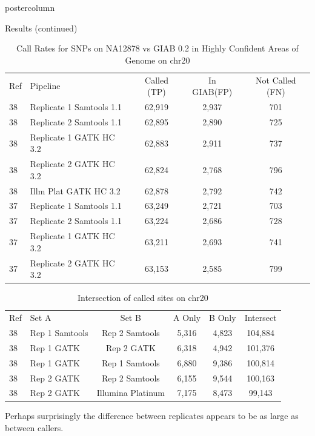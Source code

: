 \documentclass[final]{beamer}
\begin{document}
\begin{frame}{}
\begin{columns}
\begin{column}{.49\textwidth}
\begin{beamercolorbox}[center,wd=\textwidth]{postercolumn}
\begin{minipage}[T]{.95\textwidth}
            \begin{block}{Results (continued)}
            \begin{table}[h]
\begin{tabular}{|l|l|c|c|c|}
\hline
Ref & Pipeline & Called (TP) & In GIAB(FP) & Not Called (FN) \\ \cline{1-5}
38 & Replicate 1 Samtools 1.1 & 62,919 & 2,937 & 701 \\
38 & Replicate 2 Samtools 1.1 & 62,895 & 2,890 & 725 \\
38 & Replicate 1 GATK HC 3.2 & 62,883 & 2,911 & 737 \\
38 & Replicate 2 GATK HC 3.2 & 62,824 & 2,768 & 796 \\
38 & Illm Plat GATK HC 3.2 & 62,878 & 2,792 & 742 \\
37 & Replicate 1 Samtools 1.1 & 63,249 & 2,721 & 703 \\
37 & Replicate 2 Samtools 1.1 & 63,224 & 2,686 & 728 \\
37 & Replicate 1 GATK HC 3.2 & 63,211 & 2,693 & 741 \\
37 & Replicate 2 GATK HC 3.2 & 63,153 & 2,585 & 799 \\ \cline{1-5}
\hline
\end{tabular}
\caption{Call Rates for SNPs on NA12878 vs GIAB 0.2 in Highly Confident Areas of Genome on chr20}
\label{table:2}
\end{table}

            \begin{table}[h]
\begin{tabular}{|l|l|c|c|c|c|}
\hline
Ref & Set A & Set B & A Only & B Only & Intersect \\ \cline{1-6}
38 & Rep 1 Samtools & Rep 2 Samtools & 5,316 & 4,823 & 104,884 \\
38 & Rep 1 GATK & Rep 2 GATK & 6,318 & 4,942 & 101,376 \\
38 & Rep 1 GATK & Rep 1 Samtools&6,880 & 9,386 &100,814 \\
38 & Rep 2 GATK & Rep 2 Samtools&6,155 & 9,544 &100,163 \\
38 & Rep 2 GATK & Illumina Platinum&7,175 & 8,473 & 99,143 \\ \cline{1-6}
\end{tabular}
\caption{Intersection of called sites on chr20}
\end{table}

                Perhaps surprisingly the difference between replicates appears to be as large as between callers.
                

\end{block}
\end{minipage}
\end{beamercolorbox}
\end{column}
\end{columns}
\end{frame}
\end{document}
